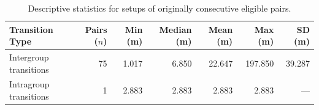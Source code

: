 \begin{table}[!htbp]
\centering
\caption{Descriptive statistics for setups of originally consecutive eligible pairs.}
\label{tab:setup_supported_stats}
\renewcommand{\arraystretch}{1.15}
\small
\begin{tabularx}{\textwidth}{Xrrrrrr}
\toprule
\textbf{Transition Type} & \textbf{Pairs ($n$)} & \textbf{Min (m)} & \textbf{Median (m)} & \textbf{Mean (m)} & \textbf{Max (m)} & \textbf{SD (m)} \\
\midrule
Intergroup transitions & 75 & 1.017 & 6.850 & 22.647 & 197.850 & 39.287 \\
Intragroup transitions & 1 & 2.883 & 2.883 & 2.883 & 2.883 & --- \\
\bottomrule
\end{tabularx}
\end{table}
